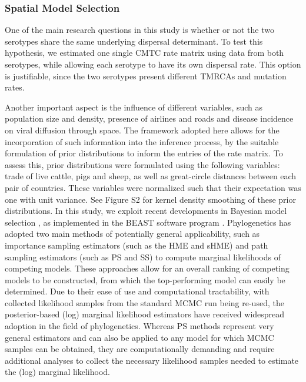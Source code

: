\documentclass[10pt]{article}
\begin{document}
\subsubsection*{Spatial Model Selection}

One of the main research questions in this study is whether or not the two serotypes share the same underlying dispersal determinant. 
To test this hypothesis, we estimated one single CMTC rate matrix using data from both serotypes, while allowing each serotype to have its own dispersal rate. 
This option is justifiable, since the two serotypes present different TMRCAs and mutation rates. 

Another important aspect is the influence of different variables, such as population size and density, presence of airlines and roads and disease incidence on viral diffusion through space. 
The framework adopted here allows for the incorporation of such information into the inference process, by the suitable formulation of prior distributions to inform the entries of the rate matrix. 
To assess this, prior distributions were formulated using the following variables: trade of live cattle, pigs and sheep, as well as great-circle distances between each pair of countries. 
These variables were normalized such that their expectation was one with unit variance. See Figure S2 for kernel density smoothing of these prior distributions.
In this study, we exploit recent developments in Bayesian model selection \cite{Baele2012}, as implemented in the BEAST software program \cite{BEAST}.
Phylogenetics has adopted two main methods of potentially general applicability, such as importance sampling estimators (such as the HME and sHME) and path sampling estimators (such as PS and SS) to compute marginal likelihoods of competing models.
These approaches allow for an overall ranking of competing models to be constructed, from which the top-performing model can easily be determined.
Due to their ease of use and computational tractability, with collected likelihood samples from the standard MCMC run being re-used, the posterior-based (log) marginal likelihood estimators have received widespread adoption in the field of phylogenetics.
Whereas PS methods represent very general estimators and can also be applied to any model for which MCMC samples can be obtained, they are computationally demanding and require additional analyses to collect the necessary likelihood samples needed to estimate the (log) marginal likelihood.
\end{document}
